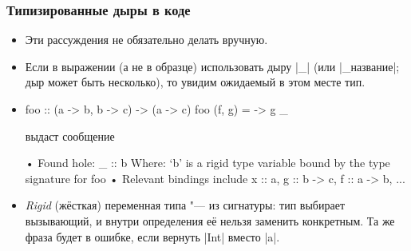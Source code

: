 \documentclass[10pt]{beamer}
\begin{document}
\begin{frame}[fragile]
  \frametitle{Типизированные дыры в коде}
  \begin{itemize}
    \item Эти рассуждения не обязательно делать вручную.
    \item Если в выражении (а не в образце) использовать дыру \haskinline|_| (или \haskinline|_название|; дыр может быть несколько), то увидим ожидаемый в этом месте тип.
    \item
          \begin{haskell}
            foo :: (a -> b, b -> c) -> (a -> c)
            foo (f, g) = \x -> g _
          \end{haskell}
          выдаст сообщение
          \begin{ghcismall}
            • Found hole: _ :: b
              Where: ‘b’ is a rigid type variable bound by
                     the type signature for foo
            • Relevant bindings include
                x :: a, g :: b -> c, f :: a -> b, ...
          \end{ghcismall}
    \item \emph{Rigid} (жёсткая) переменная типа "--- из сигнатуры: тип выбирает вызывающий, и внутри определения её нельзя заменить конкретным. Та же фраза будет в ошибке, если вернуть \haskinline|Int| вместо \haskinline|a|.
  \end{itemize}
\end{frame}
\end{document}
